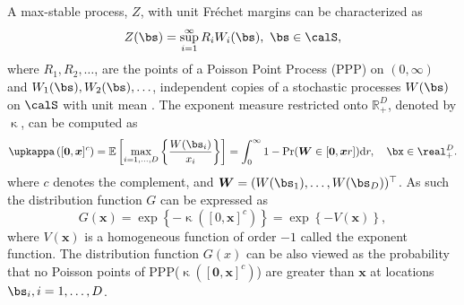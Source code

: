 \documentclass[12pt]{article}
\begin{document}
A max-stable process, $Z$,  with unit Fr\'{e}chet margins can be characterized as
\begin{equation}
\label{eq:spectralrepresentation}
	Z(\bs) = \sup_{i=1}^\infty R_iW_i(\bs),\ \bs\in\calS, 
\end{equation}
%
where $R_1, R_2, \ldots$, are the points of a Poisson Point Process (PPP) on $(0, \infty)$ 
and $W_1(\bs), W_2(\bs), \ldots$, independent copies of a stochastic processes $W(\bs)$ on $\calS$ with unit mean \citep{deHaan.Ferreira:2006, Schlather:2002}.
%
The exponent measure restricted onto $\mathbb R^D_+$, denoted by $\upkappa$, can be computed as 
%
\begin{equation}
\label{eq:exponentmeasure}
\upkappa \left([\bm 0,\bm x]^c\right)
= \mathbb E\left[\max_{i=1, \ldots, D} \left\{\frac{W(\bs_i)}{x_i}\right\} \right] 
= \int_0^\infty 1 - \Pr(\bm W \in [\bm 0,\bm xr ])\text dr,	
\quad \bx \in \real_+^D.
\end{equation}
%
where $c$ denotes the complement, and $\bm W=(W(\bs_1),\dots,W(\bs_D))^\top$. As such the distribution function $G$ can be expressed as
\begin{equation}
\label{eq:ppp}
G(\bm x) = \exp\left\{-\upkappa([0,\bm x]^c)\right\} = \exp\left\{-V(\bm x)\right\},
\end{equation}
%
where $V(\bm x)$ is a homogeneous function of order $-1$ called the exponent function. The distribution function $G(x)$ can be also viewed as the probability that no Poisson points of PPP($\upkappa \left([\bm 0,\bm x]^c\right)$) are greater than $\bm x$ at locations $\bs_i,i=1,\dots,D$.     
\end{document}
